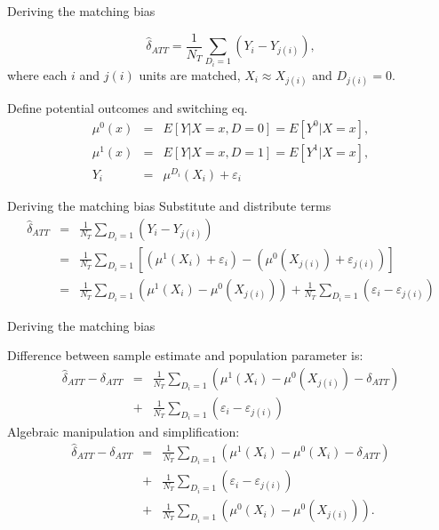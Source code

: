 \documentclass{beamer}
\begin{document}
\begin{frame}{Deriving the matching bias}
	
  \vspace{-5mm}
  $$
		\widehat{\delta}_{ATT} = \frac{1}{N_T} \sum_{D_i=1} (Y_i - Y_{j(i)}),
  $$
  where each $i$ and $j(i)$ units are matched, $X_i \approx X_{j(i)}$ and $D_{j(i)}=0$. 
	 
  \bigskip
  Define potential outcomes and switching eq.
		\begin{eqnarray*}
      \mu^0(x) &=& E[Y | X=x,D=0] = E[Y^0 | X=x],\\
      \mu^1(x) &=& E[Y | X=x,D=1] = E[Y^1 | X=x],\\
      Y_i &=& \mu^{D_i}(X_i) + \varepsilon_i
		\end{eqnarray*}
\end{frame}

\begin{frame}{Deriving the matching bias}
  Substitute and distribute terms
  \begin{eqnarray*}
    \widehat{\delta}_{ATT} &=& \frac{1}{N_T} \sum_{D_i=1} (Y_i - Y_{j(i)}) \\
    &=& \frac{1}{N_T} \sum_{D_i=1} \left[ (\mu^1(X_i) + \varepsilon_i) - (\mu^0(X_{j(i)}) + \varepsilon_{j(i)}) \right] \\
    &=&  \frac{1}{N_T} \sum_{D_i=1} (\mu^1(X_i) - \mu^0(X_{j(i)})) + \frac{1}{N_T} \sum_{D_i=1}(\varepsilon_i - \varepsilon_{j(i)})
  \end{eqnarray*}
\end{frame}
		

\begin{frame}{Deriving the matching bias}
	
Difference between sample estimate and population parameter is:
		\begin{eqnarray*}
		\widehat{\delta}_{ATT} - \delta_{ATT} &=& \frac{1}{N_T} \sum_{D_i=1} \left( \mu^1(X_i) - \mu^0(X_{j(i)}) - \delta_{ATT}\right) \\
		&+& \frac{1}{N_T} \sum_{D_i=1} (\varepsilon_i - \varepsilon_{j(i)})
		\end{eqnarray*}
Algebraic manipulation and simplification:
		\begin{eqnarray*}
		\widehat{\delta}_{ATT} - \delta_{ATT} &=& \frac{1}{N_T} \sum_{D_i=1} \left( \mu^1(X_i) - \mu^0(X_i) - \delta_{ATT}\right) \\
		&+& \frac{1}{N_T} \sum_{D_i=1} (\varepsilon_i - \varepsilon_{j(i)}) \\
		&+& \frac{1}{N_T} \sum_{D_i=1} \left( \mu^0(X_i) - \mu^0(X_{j(i)}) \right).
		\end{eqnarray*}
\end{frame}
\end{document}
